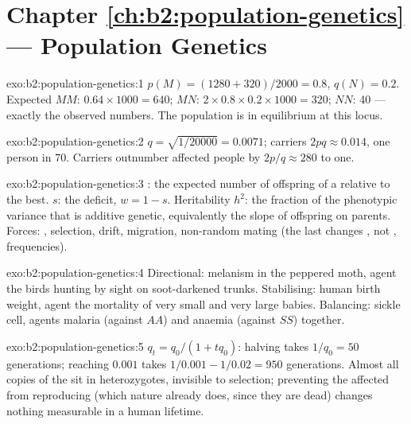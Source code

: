 \section*{Chapter \ref{ch:b2:population-genetics} --- Population Genetics}

\begin{solution}{exo:b2:population-genetics:1}
$p(M) = (1280 + 320)/2000 = 0.8$, $q(N) = 0.2$. Expected $MM$:
$0.64\times 1000 = 640$; $MN$: $2\times 0.8\times 0.2\times 1000 =
320$; $NN$: 40 --- exactly the observed numbers. The population is
in equilibrium at this locus.
\end{solution}

\begin{solution}{exo:b2:population-genetics:2}
$q = \sqrt{1/20000} = 0.0071$; carriers $2pq \approx 0.014$, one
person in 70. Carriers outnumber affected people by $2p/q \approx
280$ to one.
\end{solution}

\begin{solution}{exo:b2:population-genetics:3}
: the expected number of offspring of a  relative to
the best.  $s$: the  deficit, $w = 1 -
s$. Heritability $h^{2}$: the fraction of the phenotypic variance
that is additive genetic, equivalently the slope of offspring on
parents. Forces: , selection, drift, migration, non-random
mating (the last changes , not , frequencies).
\end{solution}

\begin{solution}{exo:b2:population-genetics:4}
Directional: melanism in the peppered moth, agent the birds hunting
by sight on soot-darkened trunks. Stabilising: human birth weight,
agent the mortality of very small and very large babies. Balancing:
sickle cell, agents malaria (against $AA$) and anaemia (against
$SS$) together.
\end{solution}

\begin{solution}{exo:b2:population-genetics:5}
$q_t = q_0/(1 + tq_0)$: halving takes $1/q_0 = 50$ generations;
reaching $0.001$ takes $1/0.001 - 1/0.02 = 950$ generations. Almost
all copies of the  sit in heterozygotes, invisible to
selection; preventing the affected from reproducing (which nature
already does, since they are dead) changes nothing measurable in a
human lifetime.
\end{solution}

